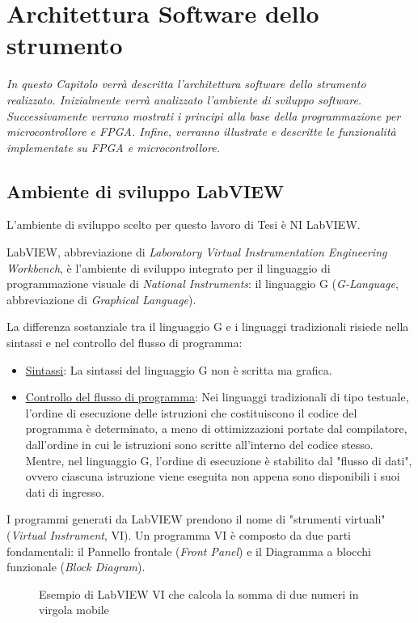 \chapter{Architettura Software dello strumento}
\label{capitolo4}
\thispagestyle{empty}

\textit{In questo Capitolo verrà descritta l'architettura software dello strumento realizzato. Inizialmente verrà analizzato l'ambiente di sviluppo software. Successivamente verrano mostrati i principi alla base della programmazione per microcontrollore e FPGA. Infine, verranno illustrate e descritte le funzionalità implementate su FPGA e microcontrollore.}

\section{Ambiente di sviluppo LabVIEW}
L'ambiente di sviluppo scelto per questo lavoro di Tesi è NI LabVIEW.

LabVIEW, abbreviazione di \textit{Laboratory Virtual Instrumentation Engineering Workbench}, è l'ambiente di sviluppo integrato per il linguaggio di programmazione visuale di \textit{National Instruments}: il linguaggio G (\textit{G-Language}, abbreviazione di \textit{Graphical Language}).

La differenza sostanziale tra il linguaggio G e i linguaggi tradizionali risiede nella sintassi e nel controllo del flusso di programma:
\begin{itemize}
	\item \underline{Sintassi}: La sintassi del linguaggio G non è scritta ma grafica. 
	\item \underline{Controllo del flusso di programma}: Nei linguaggi tradizionali di tipo testuale, l'ordine di esecuzione delle istruzioni che costituiscono il codice del programma è determinato, a meno di ottimizzazioni portate dal compilatore, dall'ordine in cui le istruzioni sono scritte all'interno del codice stesso. Mentre, nel linguaggio G, l'ordine di esecuzione è stabilito dal "flusso di dati", ovvero ciascuna istruzione viene eseguita non appena sono disponibili i suoi dati di ingresso.
\end{itemize}

I programmi generati da LabVIEW prendono il nome di "strumenti virtuali" (\textit{Virtual Instrument}, VI). Un programma VI è composto da due parti fondamentali: il Pannello frontale (\textit{Front Panel}) e il Diagramma a blocchi funzionale (\textit{Block Diagram}).

\begin{figure}
\centering
{}
\hspace{5mm}
\caption{Esempio di LabVIEW VI che calcola la somma di due numeri in virgola mobile}\label{esempiolv}
\end{figure}

